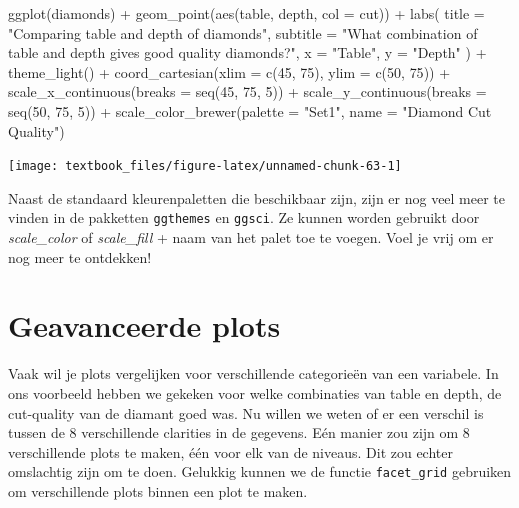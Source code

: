 \documentclass[]{tufte-book}
\newenvironment{Shaded}{}{}
\newcommand{\AttributeTok}[1]{\textcolor[rgb]{0.49,0.56,0.16}{#1}}
\newcommand{\DecValTok}[1]{\textcolor[rgb]{0.25,0.63,0.44}{#1}}
\newcommand{\FunctionTok}[1]{\textcolor[rgb]{0.02,0.16,0.49}{#1}}
\newcommand{\NormalTok}[1]{#1}
\newcommand{\SpecialCharTok}[1]{\textcolor[rgb]{0.25,0.44,0.63}{#1}}
\newcommand{\StringTok}[1]{\textcolor[rgb]{0.25,0.44,0.63}{#1}}
\begin{document}
\begin{Shaded}
\begin{Highlighting}[]
\FunctionTok{ggplot}\NormalTok{(diamonds) }\SpecialCharTok{+}
  \FunctionTok{geom\_point}\NormalTok{(}\FunctionTok{aes}\NormalTok{(table, depth, }\AttributeTok{col =}\NormalTok{ cut)) }\SpecialCharTok{+}
  \FunctionTok{labs}\NormalTok{(}
    \AttributeTok{title =} \StringTok{"Comparing table and depth of diamonds"}\NormalTok{,}
    \AttributeTok{subtitle =} \StringTok{"What combination of table and depth gives good quality diamonds?"}\NormalTok{,}
    \AttributeTok{x =} \StringTok{"Table"}\NormalTok{,}
    \AttributeTok{y =} \StringTok{"Depth"}
\NormalTok{  ) }\SpecialCharTok{+}
  \FunctionTok{theme\_light}\NormalTok{() }\SpecialCharTok{+}
  \FunctionTok{coord\_cartesian}\NormalTok{(}\AttributeTok{xlim =} \FunctionTok{c}\NormalTok{(}\DecValTok{45}\NormalTok{, }\DecValTok{75}\NormalTok{), }\AttributeTok{ylim =} \FunctionTok{c}\NormalTok{(}\DecValTok{50}\NormalTok{, }\DecValTok{75}\NormalTok{)) }\SpecialCharTok{+}
  \FunctionTok{scale\_x\_continuous}\NormalTok{(}\AttributeTok{breaks =} \FunctionTok{seq}\NormalTok{(}\DecValTok{45}\NormalTok{, }\DecValTok{75}\NormalTok{, }\DecValTok{5}\NormalTok{)) }\SpecialCharTok{+}
  \FunctionTok{scale\_y\_continuous}\NormalTok{(}\AttributeTok{breaks =} \FunctionTok{seq}\NormalTok{(}\DecValTok{50}\NormalTok{, }\DecValTok{75}\NormalTok{, }\DecValTok{5}\NormalTok{)) }\SpecialCharTok{+}
  \FunctionTok{scale\_color\_brewer}\NormalTok{(}\AttributeTok{palette =} \StringTok{"Set1"}\NormalTok{, }\AttributeTok{name =} \StringTok{"Diamond Cut Quality"}\NormalTok{)}
\end{Highlighting}
\end{Shaded}

\texttt{[image: textbook\_files/figure-latex/unnamed-chunk-63-1]}

Naast de standaard kleurenpaletten die beschikbaar zijn, zijn er nog veel meer te vinden in de pakketten \texttt{ggthemes} en \texttt{ggsci}. Ze kunnen worden gebruikt door \emph{scale\_color} of \emph{scale\_fill} + naam van het palet toe te voegen. Voel je vrij om er nog meer te ontdekken!

\hypertarget{geavanceerde-plots}{%
\section{Geavanceerde plots}\label{geavanceerde-plots}}

Vaak wil je plots vergelijken voor verschillende categorieën van een variabele. In ons voorbeeld hebben we gekeken voor welke combinaties van table en depth, de cut-quality van de diamant goed was. Nu willen we weten of er een verschil is tussen de 8 verschillende clarities in de gegevens. Eén manier zou zijn om 8 verschillende plots te maken, één voor elk van de niveaus. Dit zou echter omslachtig zijn om te doen. Gelukkig kunnen we de functie \texttt{facet\_grid} gebruiken om verschillende plots binnen een plot te maken.
\end{document}
